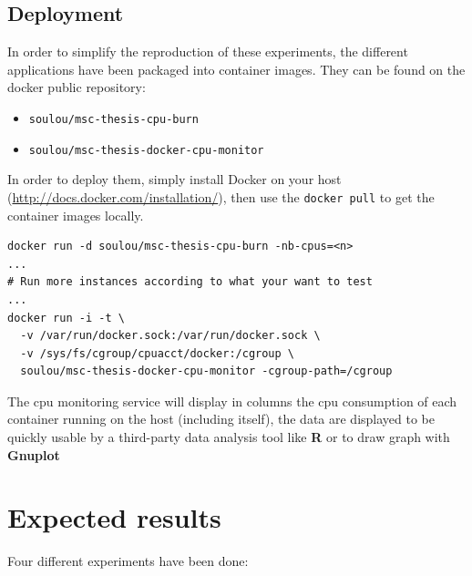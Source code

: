 \subsection{Deployment}

In order to simplify the reproduction of these experiments, the different
applications have been packaged into container images. They can be found on the
docker public repository:

\begin{itemize}
	\item{\texttt{soulou/msc-thesis-cpu-burn}}
	\item{\texttt{soulou/msc-thesis-docker-cpu-monitor}}
\end{itemize}

In order to deploy them, simply install Docker on your host
(\url{http://docs.docker.com/installation/}), then use the \texttt{docker pull}
to get the container images locally.

\vspace{1em}

\begin{lstlisting}
docker run -d soulou/msc-thesis-cpu-burn -nb-cpus=<n>
...
# Run more instances according to what your want to test
...
docker run -i -t \
  -v /var/run/docker.sock:/var/run/docker.sock \
  -v /sys/fs/cgroup/cpuacct/docker:/cgroup \
  soulou/msc-thesis-docker-cpu-monitor -cgroup-path=/cgroup
\end{lstlisting}

The cpu monitoring service will display in columns the cpu consumption
of each container running on the host (including itself), the data are
displayed to be quickly usable by a third-party data analysis tool like
\textbf{R} or to draw graph with \textbf{Gnuplot}

\section{Expected results}

Four different experiments have been done:

